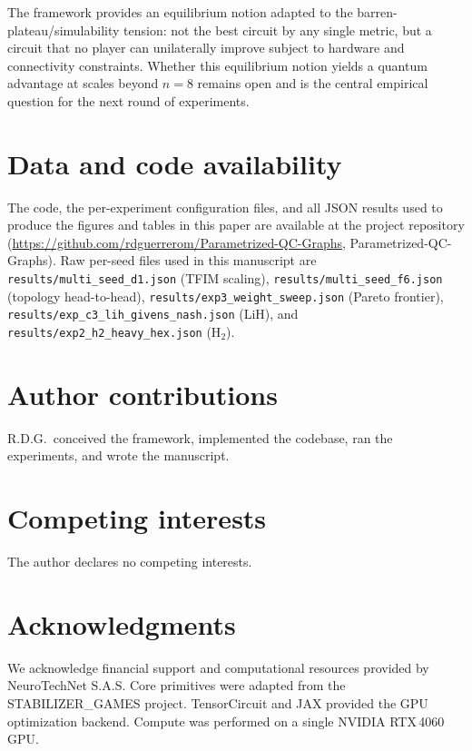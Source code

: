 \documentclass[a4paper,onecolumn,noarxiv]{quantumarticle}
\begin{document}
The framework provides an equilibrium notion adapted to the barren-plateau/simulability tension: not the best circuit by any single metric, but a circuit that no player can unilaterally improve subject to hardware and connectivity constraints. Whether this equilibrium notion yields a quantum advantage at scales beyond $n=8$ remains open and is the central empirical question for the next round of experiments.

\section*{Data and code availability}

The code, the per-experiment configuration files, and all JSON results used to produce the figures and tables in this paper are available at the project repository (\url{https://github.com/rdguerrerom/Parametrized-QC-Graphs}, Parametrized-QC-Graphs). Raw per-seed files used in this manuscript are \texttt{results/multi\_seed\_d1.json} (TFIM scaling), \texttt{results/multi\_seed\_f6.json} (topology head-to-head), \texttt{results/exp3\_weight\_sweep.json} (Pareto frontier), \texttt{results/exp\_c3\_lih\_givens\_nash.json} (LiH), and \texttt{results/exp2\_h2\_heavy\_hex.json} (H$_2$).

\section*{Author contributions}

R.D.G.\ conceived the framework, implemented the codebase, ran the experiments, and wrote the manuscript.

\section*{Competing interests}

The author declares no competing interests.

\section*{Acknowledgments}

We acknowledge financial support and computational resources provided by NeuroTechNet S.A.S. Core primitives were adapted from the STABILIZER\_GAMES project. TensorCircuit and JAX provided the GPU optimization backend. Compute was performed on a single NVIDIA RTX\,4060 GPU.
\end{document}
